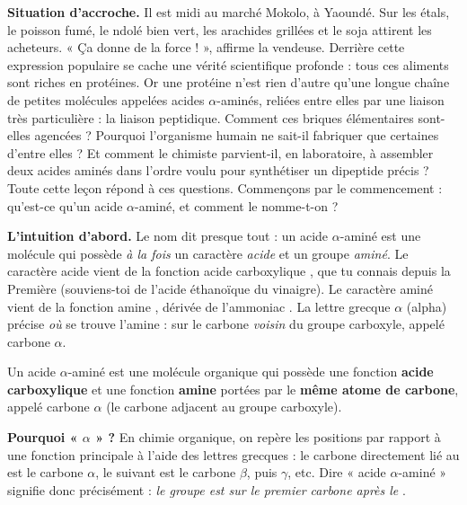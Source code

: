 \documentclass[11pt]{article}
\newcommand{\cle}[1]{{\popxbold\color{popdark}#1}}
\newcounter{popsec}
\newcounter{popsub}
\newcommand{\courssub}[1]{%
  \stepcounter{popsub}%
  \par\vspace{9pt}\noindent{\popxbold\fontsize{11.5}{13}\selectfont\color{popink}{\color{poporange}\thepopsec.\thepopsub}\hspace{6pt}#1}\par\nopagebreak\vspace{4pt}
}
\begin{document}
\textbf{Situation d'accroche.} Il est midi au marché Mokolo, à Yaoundé. Sur les étals, le poisson fumé, le ndolé bien vert, les arachides grillées et le soja attirent les acheteurs. « Ça donne de la force ! », affirme la vendeuse. Derrière cette expression populaire se cache une vérité scientifique profonde : tous ces aliments sont riches en \cle{protéines}. Or une protéine n'est rien d'autre qu'une longue chaîne de petites molécules appelées \cle{acides $\alpha$-aminés}, reliées entre elles par une liaison très particulière : la \cle{liaison peptidique}. Comment ces briques élémentaires sont-elles agencées ? Pourquoi l'organisme humain ne sait-il fabriquer que certaines d'entre elles ? Et comment le chimiste parvient-il, en laboratoire, à assembler deux acides aminés dans l'ordre voulu pour synthétiser un dipeptide précis ? Toute cette leçon répond à ces questions. Commençons par le commencement : qu'est-ce qu'un acide $\alpha$-aminé, et comment le nomme-t-on ?

\courssub{Qu'est-ce qu'un acide $\alpha$-aminé ?}

\textbf{L'intuition d'abord.} Le nom dit presque tout : un acide $\alpha$-aminé est une molécule qui possède \emph{à la fois} un caractère \emph{acide} et un groupe \emph{aminé}. Le caractère acide vient de la fonction \cle{acide carboxylique} , que tu connais depuis la Première (souviens-toi de l'acide éthanoïque du vinaigre). Le caractère aminé vient de la fonction \cle{amine} , dérivée de l'ammoniac . La lettre grecque $\alpha$ (alpha) précise \emph{où} se trouve l'amine : sur le carbone \emph{voisin} du groupe carboxyle, appelé \cle{carbone $\alpha$}.

\begin{definition}
Un \cle{acide $\alpha$-aminé} est une molécule organique qui possède une fonction \textbf{acide carboxylique}  et une fonction \textbf{amine}  portées par le \textbf{même atome de carbone}, appelé \cle{carbone $\alpha$} (le carbone adjacent au groupe carboxyle).
\end{definition}

\textbf{Pourquoi « $\alpha$ » ?} En chimie organique, on repère les positions par rapport à une fonction principale à l'aide des lettres grecques : le carbone directement lié au  est le carbone $\alpha$, le suivant est le carbone $\beta$, puis $\gamma$, etc. Dire « acide $\alpha$-aminé » signifie donc précisément : \emph{le groupe  est sur le premier carbone après le }.
\end{document}
